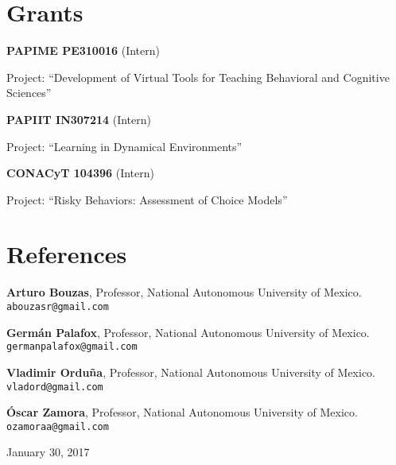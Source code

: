 \documentclass[letterpaper]{article}
\renewenvironment{itemize}{
  \begin{list}{}{
    \setlength{\leftmargin}{1.5em}
  }
}{
  \end{list}
}
\newcommand\textline[4][t]{%
  \par\smallskip\indent\parbox[#1]{.7\textwidth}{\raggedright\texttt{}#2}%
  \parbox[#1]{.05\textwidth}{\raggedright#3}%
  \parbox[#1]{.25\textwidth}{\raggedleft{#4}}\par%
}
\begin{document}
\section*{Grants}
\begin{itemize}
\setlength\itemsep{-.25em}
\setlength{\itemindent}{-.125in}
	\item \textline{{\bf PAPIME PE310016} (Intern)}{\hspace{1pt}}{2015} 
	\item {Project: ``Development of Virtual Tools for Teaching Behavioral and Cognitive Sciences''}
	\item \textline{{\bf PAPIIT IN307214} (Intern)}{\hspace{1pt}}{2014} 
	\item {Project: ``Learning in Dynamical Environments''}
	\item \textline{{\bf CONACyT 104396} (Intern)}{\hspace{1pt}}{2011} 
	\item {Project: ``Risky Behaviors: Assessment of Choice Models''}
\end{itemize}





\section*{References}
\begin{itemize}
\setlength\itemsep{-.25em}
\setlength{\itemindent}{-.125in}
	\item{\bf Arturo Bouzas}, Professor, National Autonomous University of Mexico. {\tt abouzasr@gmail.com}
	\item{\bf Germán Palafox}, Professor, National Autonomous University of Mexico. {\tt germanpalafox@gmail.com}
	\item{\bf Vladimir Orduña}, Professor, National Autonomous University of Mexico. {\tt vladord@gmail.com}
	\item{\bf Óscar Zamora}, Professor, National Autonomous University of Mexico. {\tt ozamoraa@gmail.com}
\end{itemize}

\bigskip
\begin{center}
  \begin{footnotesize}
    January 30, 2017 \\
  \end{footnotesize}
\end{center}
\end{document}
